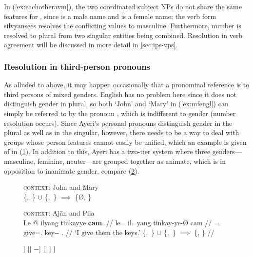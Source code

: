 In (\ref{ex:eachotheravm}), the two coordinated subject NPs do not share the
same features for \Gend{}, since  is a male name and
 is a female name; the verb form 
{silvyan}{sees} resolves the conflicting values to masculine. Furthermore,
number is resolved to plural from two singular entities being combined.
Resolution in verb agreement will be discussed in more detail in
\autoref{sec:ips-vps}.


\subsubsection{Resolution in third-person pronouns}


As alluded to above, it may happen occasionally that a pronominal reference is
to third persons of mixed genders. English has no problem here since it does
not distinguish gender in plural, so both `John' and `Mary' in
(\ref{ex:mfengl}) can simply be referred to by the pronoun , which is
indifferent to gender (number resolution occurs). Since Ayeri's personal
pronouns distinguish gender in the plural as well as in the singular, however,
there needs to be a way to deal with groups whose person features cannot easily
be unified, which an example is given of in (\ref{ex:mfayeri}). In addition to
this, Ayeri has a two-tier system where three genders---masculine, feminine,
neuter---are grouped together as animate, which is in opposition to inanimate
gender, compare (\ref{ex:gramgend2}).

\begin{figure}[h]
\pex
\a\label{ex:mfengl}%
	\textsc{context:} John and Mary \medskip \\
	\hfill \{\M{},~\Sg{}\} $\cup$  \{\F{},~\Sg{}\} $\implies$ \{Ø, \Pl\}

\a\label{ex:mfayeri}%
	\textsc{context:} Ajān and Pila \medskip \\
	\begingl
	\gla Le @ ilyang tinkayye \textbf{cam}. //
	\glb le= il=yang tinkay-ye-Ø cam //
	\glc \PatTI{}= give=\Fsg{}.\Aarg{} key-\Pl{}-\Top{} \TplM{}.\Dat{} //
	\glft `I give them the keys.' 
	\hfill \{\M{},~\Sg{}\} $\cup$ \{\F{},~\Sg{}\} $\implies$ \{\M, \Pl\} //
	\endgl
\xe
\end{figure}

\begin{figure}[h]
\ex\label{ex:gramgend2}
\begin{forest}
[{[\Gend{}]}
	[{[\Anim{} $+$]}
		[\M]
		[\F]
		[\N]
	]
	[{[\Anim{} $-$]}
		[\Inan]
	]
]
\end{forest}
\xe
\end{figure}

